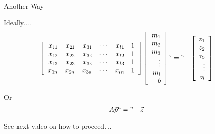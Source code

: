 \documentclass[svgnames,table,,aspectratio=169]{beamer}
\begin{document}
\begin{frame}{Another Way}

  Ideally....
  \begin{eqnarray*}
    \left[
    \begin{array}{rrrrrr}
      x_{11} & x_{21} & x_{31} &  \cdots & x_{l1} & 1 \\
      x_{12} & x_{22} & x_{32} &  \cdots & x_{l2} & 1 \\
      x_{13} & x_{23} & x_{33} &  \cdots & x_{l3} & 1 \\

      x_{1n} & x_{2n} & x_{3n} &  \cdots & x_{ln} & 1 
    \end{array}
    \right]
    \left[
    \begin{array}{r}
      m_1 \\
      m_2 \\
      m_3 \\
      \vdots \\
      m_l \\
      b  
    \end{array}
    \right]
             & ``=" &
                   \left[
                   \begin{array}{r}
                     z_1 \\
                     z_2 \\
                     z_3 \\
                     \vdots \\
                     z_l
                   \end{array}
    \right]
  \end{eqnarray*}

  Or
  \begin{eqnarray*}
    A \vec{p} & ``=" & \vec{z}
  \end{eqnarray*}

  See next video on how to proceed....
  
  
\end{frame}
\end{document}
